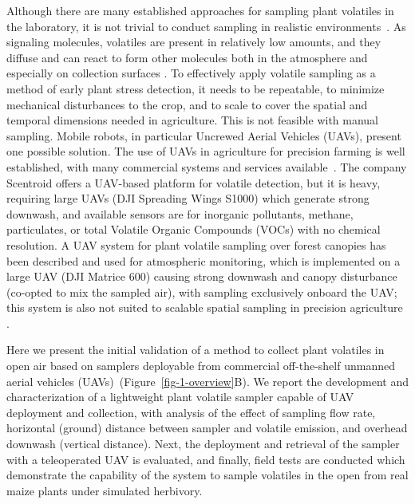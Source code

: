 Although there are many established approaches for sampling plant volatiles in the laboratory, it is not trivial to conduct sampling in realistic environments~\cite{lang_ecological_2022,tholl_trends_2021}. As signaling molecules, volatiles are present in relatively low amounts, and they diffuse and can react to form other molecules both in the atmosphere and especially on collection surfaces \cite{dettmer_ambient_2003}. To effectively apply volatile sampling as a method of early plant stress detection, it needs to be repeatable, to minimize mechanical disturbances to the crop, and to scale to cover the spatial and temporal dimensions needed in agriculture. This is not feasible with manual sampling. Mobile robots, in particular Uncrewed Aerial Vehicles (UAVs), present one possible solution. The use of UAVs in agriculture for precision farming is well established, with many commercial systems and services available~\cite{Manfreda2018, Zhang2022}. The company Scentroid offers a UAV-based platform for volatile detection, but it is heavy, requiring large UAVs (DJI Spreading Wings S1000) which generate strong downwash, and available sensors are for inorganic pollutants, methane, particulates, or total Volatile Organic Compounds (VOCs) with no chemical resolution. A UAV system for plant volatile sampling over forest canopies has been described and used for atmospheric monitoring, which is implemented on a large UAV (DJI Matrice 600) causing strong downwash and canopy disturbance (co-opted to mix the sampled air), with sampling exclusively onboard the UAV; this system is also not suited to scalable spatial sampling in precision agriculture \cite{mckinney_sampler_2019}.

Here we present the initial validation of a method to collect plant volatiles in open air based on samplers deployable from commercial off-the-shelf unmanned aerial vehicles (UAVs)~(Figure~\ref{fig-1-overview}B).
We report the development and characterization of a lightweight plant volatile sampler capable of UAV deployment and collection, with analysis of the effect of sampling flow rate, horizontal (ground) distance between sampler and volatile emission, and overhead downwash (vertical distance). Next, the deployment and retrieval of the sampler with a teleoperated UAV is evaluated, and finally, field tests are conducted which demonstrate the capability of the system to sample volatiles in the open from real maize plants under simulated herbivory.

